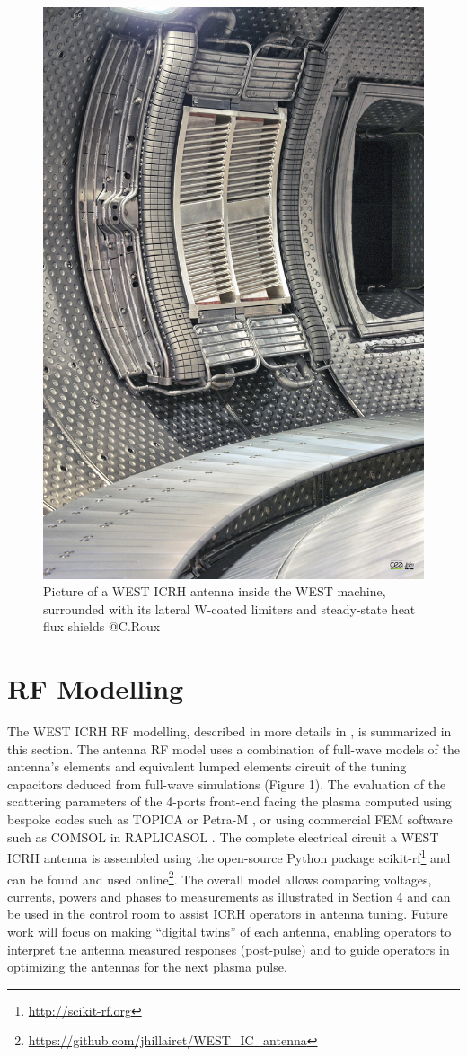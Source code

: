 \documentclass[12p]{iopart}
\begin{document}
\begin{figure}
	\centering
	\includegraphics[width=0.7\linewidth]{figures/6}
	\caption{Picture of a WEST ICRH antenna inside the WEST machine, surrounded with its lateral W-coated limiters and steady-state heat flux shields @C.Roux}
	\label{fig:ICRH_antenna_inside_WEST}
\end{figure}


\section{RF Modelling}
The WEST ICRH RF modelling, described in more details in \cite{helou2015-2, hillairet2020-2}, is summarized in this section. The antenna RF model uses a combination of full-wave models of the antenna’s elements and equivalent lumped elements circuit of the tuning capacitors deduced from full-wave simulations (Figure 1). The evaluation of the scattering parameters of the 4-ports front-end facing the plasma computed using bespoke codes such as TOPICA \cite{milanesio2009} or Petra-M \cite{bertelli2020, shiraiwa2021}, or using commercial FEM software such as COMSOL in RAPLICASOL \cite{tierens2020-2}. The complete electrical circuit a WEST ICRH antenna is assembled using the open-source Python package scikit-rf\footnote{\url{http://scikit-rf.org}}  and can be found and used online\footnote{\url{https://github.com/jhillairet/WEST_IC_antenna}}. The overall model allows comparing voltages, currents, powers and phases to measurements as illustrated in Section 4 and can be used in the control room to assist ICRH operators in antenna tuning. Future work will focus on making “digital twins” of each antenna, enabling operators to interpret the antenna measured responses (post-pulse) and to guide operators in optimizing the antennas for the next plasma pulse.
\end{document}
